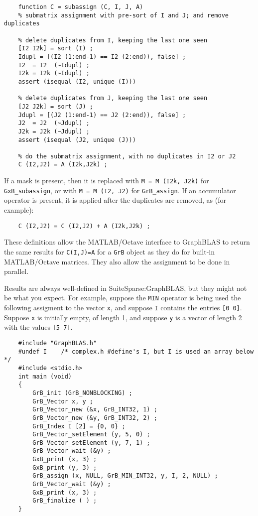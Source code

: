 \documentclass[12pt]{article}
\begin{document}
{\small
\begin{verbatim}
    function C = subassign (C, I, J, A)
    % submatrix assignment with pre-sort of I and J; and remove duplicates

    % delete duplicates from I, keeping the last one seen
    [I2 I2k] = sort (I) ;
    Idupl = [(I2 (1:end-1) == I2 (2:end)), false] ;
    I2  = I2  (~Idupl) ;
    I2k = I2k (~Idupl) ;
    assert (isequal (I2, unique (I)))

    % delete duplicates from J, keeping the last one seen
    [J2 J2k] = sort (J) ;
    Jdupl = [(J2 (1:end-1) == J2 (2:end)), false] ;
    J2  = J2  (~Jdupl) ;
    J2k = J2k (~Jdupl) ;
    assert (isequal (J2, unique (J)))

    % do the submatrix assignment, with no duplicates in I2 or J2
    C (I2,J2) = A (I2k,J2k) ;
\end{verbatim}}

If a mask is present, then it is replaced with \verb'M = M (I2k, J2k)' for
\verb'GxB_subassign', or with \verb'M = M (I2, J2)' for \verb'GrB_assign'.
If an accumulator operator is present, it is applied after the duplicates
are removed, as (for example):

{\small
\begin{verbatim}
    C (I2,J2) = C (I2,J2) + A (I2k,J2k) ;
\end{verbatim}}

These definitions allow the MATLAB/Octave interface to GraphBLAS to return the same
results for \verb'C(I,J)=A' for a \verb'GrB' object as they do for built-in
MATLAB/Octave matrices.  They also allow the assignment to be done in parallel.

Results are always well-defined in SuiteSparse:GraphBLAS, but they might not be
what you expect.  For example, suppose the \verb'MIN' operator is being used
the following assigment to the vector \verb'x', and suppose \verb'I' contains
the entries \verb'[0 0]'.  Suppose \verb'x' is initially empty, of length 1,
and suppose \verb'y' is a vector of length 2 with the values \verb'[5 7]'.

{\small
\begin{verbatim}
    #include "GraphBLAS.h"
    #undef I    /* complex.h #define's I, but I is used an array below */
    #include <stdio.h>
    int main (void)
    {
        GrB_init (GrB_NONBLOCKING) ;
        GrB_Vector x, y ;
        GrB_Vector_new (&x, GrB_INT32, 1) ;
        GrB_Vector_new (&y, GrB_INT32, 2) ;
        GrB_Index I [2] = {0, 0} ;
        GrB_Vector_setElement (y, 5, 0) ;
        GrB_Vector_setElement (y, 7, 1) ;
        GrB_Vector_wait (&y) ;
        GxB_print (x, 3) ;
        GxB_print (y, 3) ;
        GrB_assign (x, NULL, GrB_MIN_INT32, y, I, 2, NULL) ;
        GrB_Vector_wait (&y) ;
        GxB_print (x, 3) ;
        GrB_finalize ( ) ;
    }
\end{verbatim}}
\end{document}
